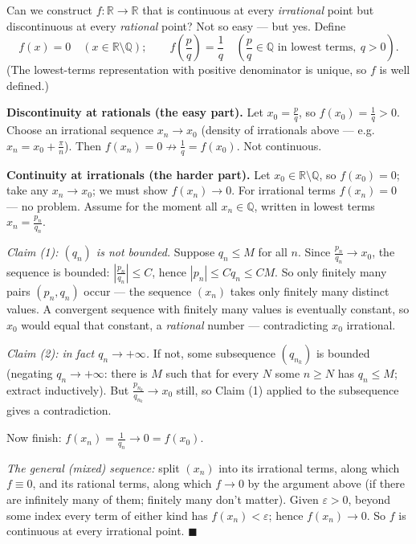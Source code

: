 \documentclass[11pt]{report}
\begin{document}
\begin{exbox}
Can we construct $f: \mathbb{R} \to \mathbb{R}$ that is continuous at every \emph{irrational} point but discontinuous at every \emph{rational} point? Not so easy --- but yes. Define
\[
f(x) = 0 \quad (x \in \mathbb{R}\setminus\mathbb{Q}); \qquad f\left(\frac pq\right) = \frac1q \quad \left( \frac pq \in \mathbb{Q} \text{ in lowest terms},\ q > 0 \right).
\]
(The lowest-terms representation with positive denominator is unique, so $f$ is well defined.)

\textbf{Discontinuity at rationals (the easy part).} Let $x_0 = \tfrac pq$, so $f(x_0) = \tfrac1q > 0$. Choose an irrational sequence $x_n \to x_0$ (density of irrationals above --- e.g.\ $x_n = x_0 + \tfrac\pi n$). Then $f(x_n) = 0 \not\to \tfrac1q = f(x_0)$. Not continuous.

\textbf{Continuity at irrationals (the harder part).} Let $x_0 \in \mathbb{R}\setminus\mathbb{Q}$, so $f(x_0) = 0$; take any $x_n \to x_0$; we must show $f(x_n) \to 0$. For irrational terms $f(x_n) = 0$ --- no problem. Assume for the moment all $x_n \in \mathbb{Q}$, written in lowest terms $x_n = \tfrac{p_n}{q_n}$.

\emph{Claim (1): $(q_n)$ is not bounded.} Suppose $q_n \leq M$ for all $n$. Since $\tfrac{p_n}{q_n} \to x_0$, the sequence is bounded: $\left|\tfrac{p_n}{q_n}\right| \leq C$, hence $|p_n| \leq C q_n \leq CM$. So only finitely many pairs $(p_n, q_n)$ occur --- the sequence $(x_n)$ takes only finitely many distinct values. A convergent sequence with finitely many values is eventually constant, so $x_0$ would equal that constant, a \emph{rational} number --- contradicting $x_0$ irrational.

\emph{Claim (2): in fact $q_n \to +\infty$.} If not, some subsequence $(q_{n_k})$ is bounded (negating $q_n \to +\infty$: there is $M$ such that for every $N$ some $n \geq N$ has $q_n \leq M$; extract inductively). But $\tfrac{p_{n_k}}{q_{n_k}} \to x_0$ still, so Claim (1) applied to the subsequence gives a contradiction.

Now finish: $f(x_n) = \tfrac{1}{q_n} \to 0 = f(x_0)$.

\emph{The general (mixed) sequence:} split $(x_n)$ into its irrational terms, along which $f \equiv 0$, and its rational terms, along which $f \to 0$ by the argument above (if there are infinitely many of them; finitely many don't matter). Given $\varepsilon > 0$, beyond some index every term of either kind has $f(x_n) < \varepsilon$; hence $f(x_n) \to 0$. So $f$ is continuous at every irrational point. \hfill $\blacksquare$
\end{exbox}
\end{document}
